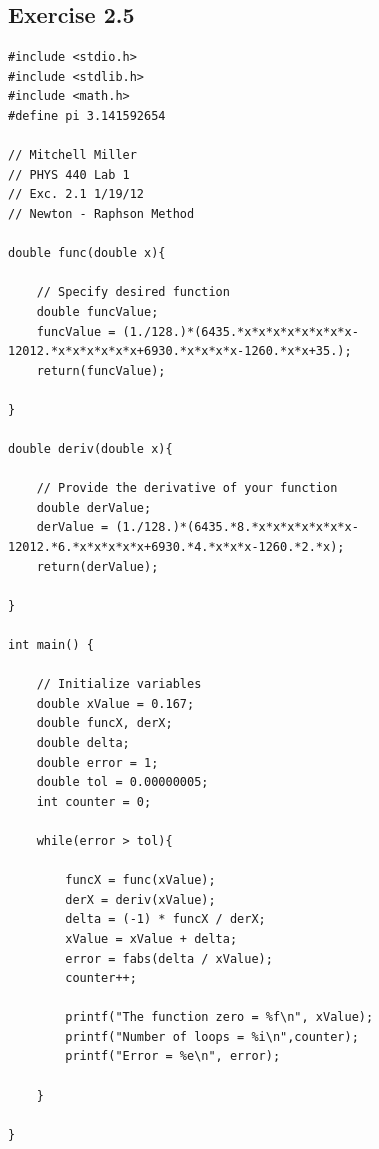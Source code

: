 \documentclass[12pt]{article}
\begin{document}
\subsection{Exercise 2.5}
\begin{verbatim}
#include <stdio.h>
#include <stdlib.h>
#include <math.h>
#define pi 3.141592654

// Mitchell Miller
// PHYS 440 Lab 1
// Exc. 2.1 1/19/12
// Newton - Raphson Method

double func(double x){

	// Specify desired function
	double funcValue;
	funcValue = (1./128.)*(6435.*x*x*x*x*x*x*x*x-12012.*x*x*x*x*x*x+6930.*x*x*x*x-1260.*x*x+35.);
	return(funcValue);

}

double deriv(double x){

	// Provide the derivative of your function
	double derValue;
	derValue = (1./128.)*(6435.*8.*x*x*x*x*x*x*x-12012.*6.*x*x*x*x*x+6930.*4.*x*x*x-1260.*2.*x);
	return(derValue);

}

int main() {

	// Initialize variables
	double xValue = 0.167;
	double funcX, derX;
	double delta;
	double error = 1;
	double tol = 0.00000005;
	int counter = 0;

	while(error > tol){

		funcX = func(xValue);
		derX = deriv(xValue);
		delta = (-1) * funcX / derX;
		xValue = xValue + delta;
		error = fabs(delta / xValue);
		counter++;
		
		printf("The function zero = %f\n", xValue);
		printf("Number of loops = %i\n",counter);
		printf("Error = %e\n", error);

	}

}
\end{verbatim}
\end{document}
